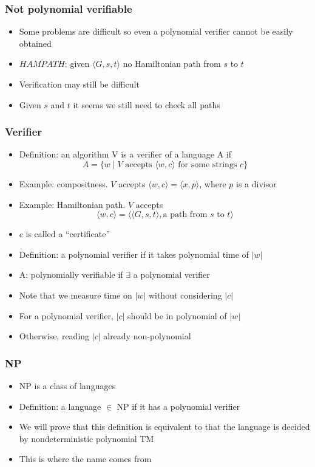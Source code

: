 \begin{frame}[allowframebreaks] \frametitle{Not polynomial verifiable}
  \begin{itemize}
  \item Some problems are difficult so even a polynomial verifier cannot
    be easily obtained
\item $\overline{HAMPATH}$: given $\langle  G,s,t\rangle$ no Hamiltonian
path from $s$ to $t$

\item Verification may still be difficult
\item Given $s$ and $t$ it seems we 
still need to check all paths

\end{itemize}\end{frame} \begin{frame}[allowframebreaks] \frametitle{Verifier}
  \begin{itemize}
\item Definition: an algorithm V is a verifier of a language A if
  \begin{equation*}
    A=\{w\mid
V \mbox{ accepts } 
\langle  w,c\rangle  
\mbox{ for some strings } c\}
  \end{equation*}
\item Example: compositness. $V$ accepts $\langle  w,c\rangle  = \langle  x,p\rangle $, where $p$ is a divisor
\item Example: Hamiltonian path. $V$ accepts
  \begin{equation*}
  \langle  w,c\rangle  = \langle  \langle  G,s,t\rangle , \mbox{a path from $s$ to $t$}\rangle 
\end{equation*}
\item $c$ is called a  ``certificate''
\item Definition: a polynomial verifier if it takes polynomial time of $|w|$
\item A: polynomially verifiable if 
  $\exists$ a polynomial verifier
\item Note that we measure time on $|w|$ without considering $|c|$

\item For a polynomial verifier,  $|c|$ should be in polynomial of $|w|$

\item [] Otherwise, reading $|c|$ already non-polynomial
\end{itemize}\end{frame} \begin{frame}[allowframebreaks] \frametitle{NP}
  \begin{itemize}
\item NP is a class of languages 
\item Definition: a language $\in$ NP if it has a polynomial verifier
\item We will prove that this definition is equivalent to that the language
  is decided by nondeterministic polynomial TM 
\item This is where the name comes from


\end{itemize}
\end{frame}

